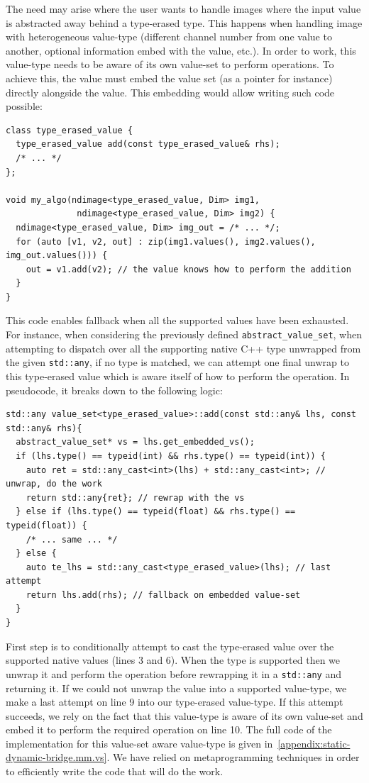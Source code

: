 The need may arise where the user wants to handle images where the input value is abstracted away behind a type-erased
type. This happens when handling image with heterogeneous value-type (different channel number from one value to
another, optional information embed with the value, etc.). In order to work, this value-type needs to be aware of its
own value-set  to perform operations. To achieve this, the value must embed the value set (as a pointer for instance)
directly alongside the value. This embedding would allow writing such code possible:
\begin{verbatim}
class type_erased_value {
  type_erased_value add(const type_erased_value& rhs);
  /* ... */
};

void my_algo(ndimage<type_erased_value, Dim> img1,
              ndimage<type_erased_value, Dim> img2) {
  ndimage<type_erased_value, Dim> img_out = /* ... */;
  for (auto [v1, v2, out] : zip(img1.values(), img2.values(), img_out.values())) {
    out = v1.add(v2); // the value knows how to perform the addition
  }
}
\end{verbatim}

This code enables fallback when all the supported values have been exhausted. For instance, when considering the
previously defined \texttt{abstract\_value\_set}, when attempting to dispatch over all the supporting native C++ type
unwrapped from the given \texttt{std::any}, if no type is matched, we can attempt one final unwrap to this type-erased
value which is aware itself of how to perform the operation. In pseudocode, it breaks down to the following logic:
\begin{verbatim}
std::any value_set<type_erased_value>::add(const std::any& lhs, const std::any& rhs){
  abstract_value_set* vs = lhs.get_embedded_vs();
  if (lhs.type() == typeid(int) && rhs.type() == typeid(int)) {
    auto ret = std::any_cast<int>(lhs) + std::any_cast<int>; // unwrap, do the work
    return std::any{ret}; // rewrap with the vs
  } else if (lhs.type() == typeid(float) && rhs.type() == typeid(float)) {
    /* ... same ... */
  } else {
    auto te_lhs = std::any_cast<type_erased_value>(lhs); // last attempt
    return lhs.add(rhs); // fallback on embedded value-set
  }
}
\end{verbatim}
First step is to conditionally attempt to cast the type-erased value over the supported native values (lines 3 and 6).
When the type is supported then we unwrap it and perform the operation before rewrapping it in a \texttt{std::any} and
returning it. If we could not unwrap the value into a supported value-type, we make a last attempt on line 9 into our
type-erased value-type. If this attempt succeeds, we rely on the fact that this value-type is aware of its own value-set
and embed it to perform the required operation on line 10. The full code of the implementation for this value-set aware
value-type is given in~\cref{appendix:static-dynamic-bridge.mm.vs}. We have relied on metaprogramming techniques in
order to efficiently write the code that will do the work.

